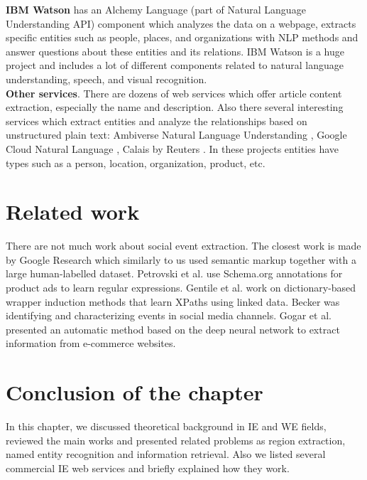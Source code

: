 \noindent \textbf{IBM Watson} \cite{IBMAlchemy} has an Alchemy Language (part of Natural Language Understanding API) component which analyzes the data on a webpage, extracts specific entities such as people, places, and organizations with NLP methods and answer questions about these entities and its relations. IBM Watson is a huge project and includes a lot of different components related to natural language understanding, speech, and visual recognition.\\  

\noindent\textbf{Other services}. There are dozens of web services which offer article content extraction, especially the name and description. Also there several interesting services which extract entities and analyze the relationships based on unstructured plain text: Ambiverse Natural Language Understanding \cite{Ambiverse}, Google Cloud Natural Language \cite{GoogNLP}, Calais by Reuters \cite{Calais}. In these projects entities have types such as a person, location, organization, product, etc.

\section{Related work}

There are not much work about social event extraction. The closest work is made by Google Research \cite{GoogEvent} which similarly to us used semantic markup together with a large human-labelled dataset. Petrovski et al. \cite{Petrovski} use Schema.org annotations for product ads to learn regular expressions. Gentile et al. \cite{Gentile} work on dictionary-based wrapper induction methods that learn XPaths using linked data. Becker \cite{becker} was identifying
and characterizing events in social media channels. Gogar et al. \cite{Gogar2016}
presented an automatic method based on the deep neural network to extract information from e-commerce websites.

\section*{Conclusion of the chapter}
In this chapter, we discussed theoretical background in IE and WE fields, reviewed the main works and presented related problems as region extraction, named entity recognition and information retrieval. Also we listed several commercial IE web services and briefly explained how they work.